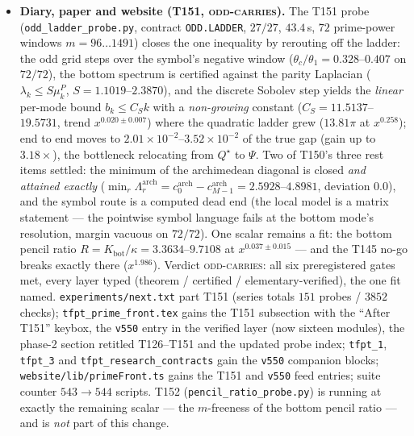 \documentclass[11pt]{article}
\begin{document}
\begin{itemize}[leftmargin=1.5em]
{pre-existing contract moves}, and this is not RH evidence.
\item \textbf{Diary, paper and website (T151, \textsc{odd-carries}).} The T151 probe
(\texttt{odd\_\allowbreak ladder\_\allowbreak probe.py}, contract \texttt{ODD.LADDER},
$27/27$, $43.4$\,s, $72$ prime-power windows $m=96\ldots1491$) closes the one inequality by
rerouting off the ladder: the odd grid steps over the symbol's negative window
($\theta_c/\theta_1=0.328$--$0.407$ on $72/72$), the bottom spectrum is certified against the
parity Laplacian ($\lambda_k\le S\mu^P_k$, $S=1.1019$--$2.3870$), and the discrete Sobolev
step yields the \emph{linear} per-mode bound $b_k\le C_Sk$ with a \emph{non-growing} constant
($C_S=11.5137$--$19.5731$, trend $x^{0.020\pm0.007}$) where the quadratic ladder grew
($13.81\pi$ at $x^{0.258}$); end to end moves to
$2.01\times10^{-2}$--$3.52\times10^{-2}$ of the true gap (gain up to $3.18\times$), the
bottleneck relocating from $Q^\star$ to $\Psi$. Two of T150's three rest items settled: the
minimum of the archimedean diagonal is closed \emph{and attained exactly}
($\min_r\Lambda^{\mathrm{arch}}_r=c^{\mathrm{arch}}_0-c^{\mathrm{arch}}_{M-1}=2.5928$--$4.8981$,
deviation $0.0$), and the symbol route is a computed dead end (the local model is a matrix
statement --- the pointwise symbol language fails at the bottom mode's resolution, margin
vacuous on $72/72$). One scalar remains a fit: the bottom pencil ratio
$R=K_{\mathrm{bot}}/\kappa=3.3634$--$9.7108$ at $x^{0.037\pm0.015}$ --- and the T145 no-go
breaks exactly there ($x^{1.986}$). Verdict \textsc{odd-carries}: all six preregistered gates
met, every layer typed (theorem / certified / elementary-verified), the one fit named.
\texttt{experiments/next.txt} part T151 (series totals $151$ probes / $3852$ checks);
\texttt{tfpt\_prime\_front.tex} gains the T151 subsection with the ``After T151'' keybox, the
\texttt{v550} entry in the verified layer (now sixteen modules), the phase-2 section retitled
T126--T151 and the updated probe index; \texttt{tfpt\_1}, \texttt{tfpt\_3} and
\texttt{tfpt\_research\_contracts} gain the \texttt{v550} companion blocks;
\texttt{website/lib/primeFront.ts} gains the T151 and \texttt{v550} feed entries; suite counter
$543\to544$ scripts. T152 (\texttt{pencil\_ratio\_probe.py}) is running at exactly the
remaining scalar --- the $m$-freeness of the bottom pencil ratio --- and is \emph{not} part of
this change.
\end{itemize}
\end{document}
